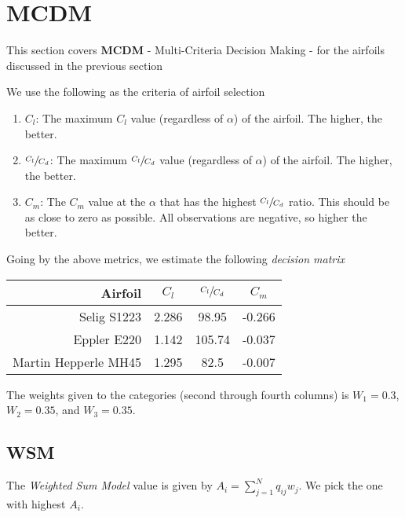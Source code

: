 
\section{MCDM}

This section covers \textbf{MCDM} - Multi-Criteria Decision Making - for the airfoils discussed in the previous section

We use the following as the criteria of airfoil selection

\begin{enumerate}
    \item $C_l$: The maximum $C_l$ value (regardless of $\alpha$) of the airfoil. The higher, the better.
    \item $\sfrac{C_l}{C_d}$: The maximum $\sfrac{C_l}{C_d}$ value (regardless of $\alpha$) of the airfoil. The higher, the better.
    \item $C_m$: The $C_m$ value at the $\alpha$ that has the highest $\sfrac{C_l}{C_d}$ ratio. This should be as close to zero as possible. All observations are negative, so higher the better.
\end{enumerate}

Going by the above metrics, we estimate the following \emph{decision matrix}

\begin{table}[h]
    \centering
    \begin{tabular}{||r|c|c|c||}
        \hline
        Airfoil & $C_l$ & $\sfrac{C_l}{C_d}$ & $C_m$ \\
        \hline \hline
        Selig S1223 & 2.286 & 98.95 & -0.266 \\
        \hline
        Eppler E220 & 1.142 & 105.74 & -0.037 \\
        \hline
        Martin Hepperle MH45 & 1.295 & 82.5 & -0.007 \\
        \hline
    \end{tabular}
\end{table}

The weights given to the categories (second through fourth columns) is $W_1 = 0.3$, $W_2 = 0.35$, and $W_3 = 0.35$.

\subsection{WSM}

The \emph{Weighted Sum Model} value is given by $A_i = \sum_{j=1}^{N} q_{ij} w_j$. We pick the one with highest $A_i$.

